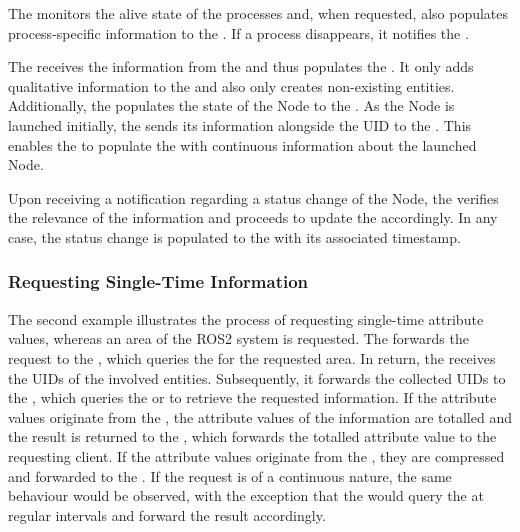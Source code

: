             The  monitors the alive state of the processes and, when requested, also populates process-specific information to the . If a process disappears, it notifies the .

            The  receives the information from the  and thus populates the . It only adds qualitative information to the  and also only creates non-existing entities. Additionally, the  populates the state of the Node to the .\newline
            As the Node is launched initially, the  sends its information alongside the UID to the . This enables the  to populate the  with continuous information about the launched Node.

            Upon receiving a notification regarding a status change of the Node, the  verifies the relevance of the information and proceeds to update the  accordingly. In any case, the status change is populated to the  with its associated timestamp.


            \subsubsection{Requesting Single-Time Information}
            The second example illustrates the process of requesting single-time attribute values, whereas an area of the ROS2 system is requested.
            The  forwards the request to the , which queries the  for the requested area. In return, the  receives the UIDs of the involved entities. Subsequently, it forwards the collected UIDs to the , which queries the  or  to retrieve the requested information. If the attribute values originate from the , the attribute values of the information are totalled and the result is returned to the , which forwards the totalled attribute value to the requesting client. If the attribute values originate from the , they are compressed and forwarded to the .\newline
            If the request is of a continuous nature, the same behaviour would be observed, with the exception that the  would query the  at regular intervals and forward the result accordingly.


